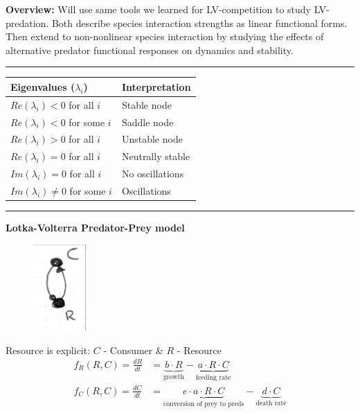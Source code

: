 \documentclass{article}
\begin{document}
\noindent{}
\textbf{Overview:} Will use same tools we learned for LV-competition to study LV-predation.  Both describe species interaction strengths as linear functional forms.  Then extend to non-nonlinear species interaction by studying the effects of alternative predator functional responses on dynamics and stability.

\rule[0.5ex]{\linewidth}{1pt}
\begin{center}
	\begin{tabular}{ll}
		\hline
		\textbf{Eigenvalues ($\lambda_i$)} & \textbf{Interpretation} \\ 
		\hline
		$Re(\lambda_i)< 0$  for all $i$& Stable node\\ 
		$Re(\lambda_i)< 0$ for some $i$ & Saddle node \\ 
		$Re(\lambda_i)> 0$ for all $i$ & Unstable node \\ 
		$Re(\lambda_i) = 0$ for all $i$ & Neutrally stable \\ 
		\hline
		$Im(\lambda_i) = 0$ for all $i$ & No oscillations \\ 
		$Im(\lambda_i) \neq 0$ for some $i$  & Oscillations \\ 
		\hline
	\end{tabular} 
\end{center}
\rule[0.5ex]{\linewidth}{1pt}

\textbf{Lotka-Volterra Predator-Prey model}

\begin{figure}
	\includegraphics[width=2cm]{figs/CR_digraph.pdf}
\end{figure}
Resource is explicit:  $C$ - Consumer \& $R$ - Resource
\begin{align*}
	f_R(R,C)=\frac{dR}{dt} &= \underbrace{b \cdot R}_{\text{growth}} - \underbrace{a \cdot R \cdot C}_{\text{feeding rate}}\\
	f_C(R,C)=\frac{dC}{dt} &= \underbrace{e \cdot a \cdot R \cdot C}_{\text{conversion of prey to preds}} - \underbrace{d \cdot C}_{\text{death rate}}
\end{align*}
\end{document}
